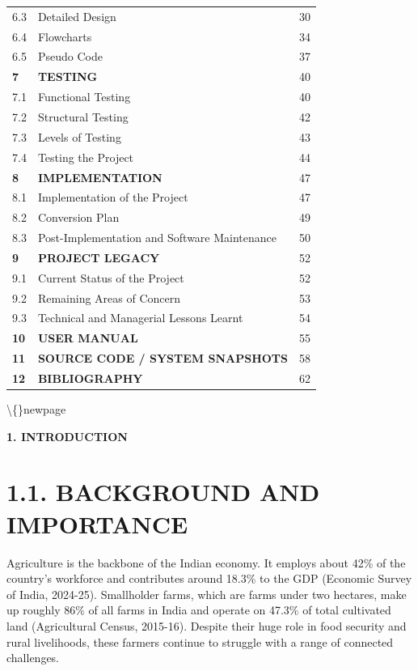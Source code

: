 \documentclass[12pt, a4paper]{report}
\begin{document}
\begin{table}[htbp]
\begin{tabularx}{\textwidth}{|X|X|X|}
6.3 & Detailed Design & 30 \\
6.4 & Flowcharts & 34 \\
6.5 & Pseudo Code & 37 \\
\textbf{7} & \textbf{TESTING} & 40 \\
7.1 & Functional Testing & 40 \\
7.2 & Structural Testing & 42 \\
7.3 & Levels of Testing & 43 \\
7.4 & Testing the Project & 44 \\
\textbf{8} & \textbf{IMPLEMENTATION} & 47 \\
8.1 & Implementation of the Project & 47 \\
8.2 & Conversion Plan & 49 \\
8.3 & Post-Implementation and Software Maintenance & 50 \\
\textbf{9} & \textbf{PROJECT LEGACY} & 52 \\
9.1 & Current Status of the Project & 52 \\
9.2 & Remaining Areas of Concern & 53 \\
9.3 & Technical and Managerial Lessons Learnt & 54 \\
\textbf{10} & \textbf{USER MANUAL} & 55 \\
\textbf{11} & \textbf{SOURCE CODE / SYSTEM SNAPSHOTS} & 58 \\
\textbf{12} & \textbf{BIBLIOGRAPHY} & 62 \\
\hline
\end{tabularx}
\end{table}

\textbackslash\{\}newpage

\begin{center}
{\fontsize{14}{17}\bfseries 1. INTRODUCTION}\\
\end{center}
\section{1.1. BACKGROUND AND IMPORTANCE}
Agriculture is the backbone of the Indian economy. It employs about 42\% of the country's workforce and contributes around 18.3\% to the GDP (Economic Survey of India, 2024-25). Smallholder farms, which are farms under two hectares, make up roughly 86\% of all farms in India and operate on 47.3\% of total cultivated land (Agricultural Census, 2015-16). Despite their huge role in food security and rural livelihoods, these farmers continue to struggle with a range of connected challenges.
\end{document}
